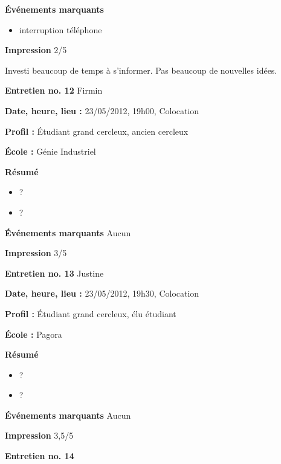 \documentclass[a4paper, 11px]{article}
\begin{document}
\vspace{.25cm}
\textbf{Événements marquants}
	\begin{itemize}
		\item interruption téléphone
	\end{itemize}

\vspace{.25cm}
\textbf{Impression}
2/5

Investi beaucoup de temps à s'informer. Pas beaucoup de nouvelles idées.



\vspace{.3cm}

 \textbf {\large Entretien no. 12}
Firmin

\textbf{Date, heure, lieu : }
23/05/2012, 19h00, Colocation

\textbf{Profil : }
Étudiant grand cercleux, ancien cercleux

\textbf{École : }
Génie Industriel

\textbf{Résumé}
	\begin{itemize}
		\item ?
		\item ?
	\end{itemize}

\textbf{Événements marquants}
Aucun

\textbf{Impression}
3/5


\vspace{.3cm}

 \textbf {\large Entretien no. 13}
Justine

\textbf{Date, heure, lieu : }
23/05/2012, 19h30, Colocation

\textbf{Profil : }
Étudiant grand cercleux, élu étudiant

\textbf{École : }
Pagora

\textbf{Résumé}
	\begin{itemize}
		\item ?
		\item ?
	\end{itemize}

\textbf{Événements marquants}
Aucun

\textbf{Impression}
3,5/5



\vspace{.3cm}

 \textbf {\large Entretien no. 14}
\end{document}

